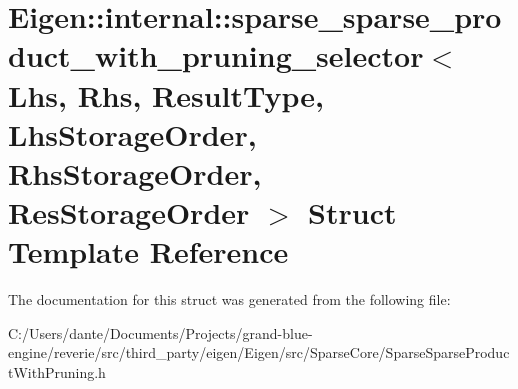 \hypertarget{struct_eigen_1_1internal_1_1sparse__sparse__product__with__pruning__selector}{}\section{Eigen\+::internal\+::sparse\+\_\+sparse\+\_\+product\+\_\+with\+\_\+pruning\+\_\+selector$<$ Lhs, Rhs, Result\+Type, Lhs\+Storage\+Order, Rhs\+Storage\+Order, Res\+Storage\+Order $>$ Struct Template Reference}
\label{struct_eigen_1_1internal_1_1sparse__sparse__product__with__pruning__selector}


The documentation for this struct was generated from the following file\+:\begin{DoxyCompactItemize}
\item 
C\+:/\+Users/dante/\+Documents/\+Projects/grand-\/blue-\/engine/reverie/src/third\+\_\+party/eigen/\+Eigen/src/\+Sparse\+Core/Sparse\+Sparse\+Product\+With\+Pruning.\+h\end{DoxyCompactItemize}
